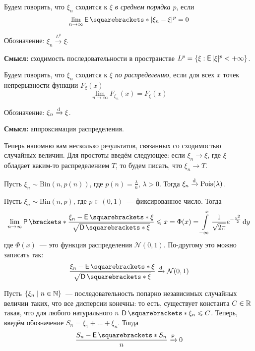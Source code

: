 \begin{definition}
	Будем говорить, что \(\xi_n\) сходится к \(\xi\) \emph{в среднем порядка \(p\)}, если
	\[
	\lim\limits_{n \to \infty} \E{|\xi_n - \xi|^p} = 0
	\]
	
	Обозначение: \(\xi_n \xrightarrow{L^p} \xi\).
\end{definition}

\textbf{Смысл:} сходимость последовательности в пространстве \(L^{p} = \{\xi : \E|\xi|^p < +\infty\}\).

\begin{definition}
	Будем говорить, что \(\xi_n\) сходится к \(\xi\) \emph{по распределению}, если для всех \(x\) точек непрерывности функции $F_{\xi}(x)$
	\[
	\lim\limits_{n \to \infty} F_{\xi_n}(x) = F_{\xi}(x)
	\]
	
	Обозначение: \(\xi_n \xrightarrow{\mathrm{d}} \xi\).
\end{definition}

\textbf{Смысл:} аппроксимация распределения.

Теперь напомню вам несколько результатов, связанных со сходимостью случайных величин. Для простоты введём следующее: если \(\xi_n \to \xi\), где \(\xi\) обладает каким-то распределением \(T\), то будем писать, что \(\xi_n \to T\).

\begin{theorem}[Пуассон]
	Пусть \(\xi_n \sim \mathrm{Bin}(n, p(n))\), где \(p(n) = \frac{\lambda}{n}\), \(\lambda > 0\). Тогда \(\xi_n \xrightarrow{\mathrm{d}} \mathrm{Pois}(\lambda)\). 
\end{theorem}
\begin{theorem}
	Пусть \(\xi_n \sim \mathrm{Bin}(n, p)\), где \(p \in (0, 1)\)~--- фиксированное число. Тогда
	\[
		\lim\limits_{n \to \infty} \Pr{\frac{\xi_n - \E{\xi}}{\sqrt{\D{\xi}}} \leq x} = \Phi(x) = \int\limits_{-\infty}^{x} \frac{1}{\sqrt{2\pi}}e^{-\frac{y^2}{2}}\diff y
	\]
	где \(\Phi(x)\)~--- это функция распределения \(\mathcal{N}(0, 1)\). По-другому это можно записать так:
	\[
		\frac{\xi_n - \E{\xi}}{\sqrt{\D{\xi}}} \dto \mathcal{N}(0, 1)
	\]
\end{theorem}
\begin{theorem}
	Пусть \(\{\xi_n \mid n \in \mathbb{N}\}\)~--- последовательность попарно независимых случайных величин таких, что все дисперсии конечны: то есть, существует константа \(C \in \mathbb{R}\) такая, что для любого натурального \(n\) \(\D{\xi_n} \leq C\). Теперь, введём обозначение \(S_n = \xi_1 + \dots + \xi_n\). Тогда
	\[
		\frac{S_n - \E{S_n}}{n} \prto 0
	\]
\end{theorem}

